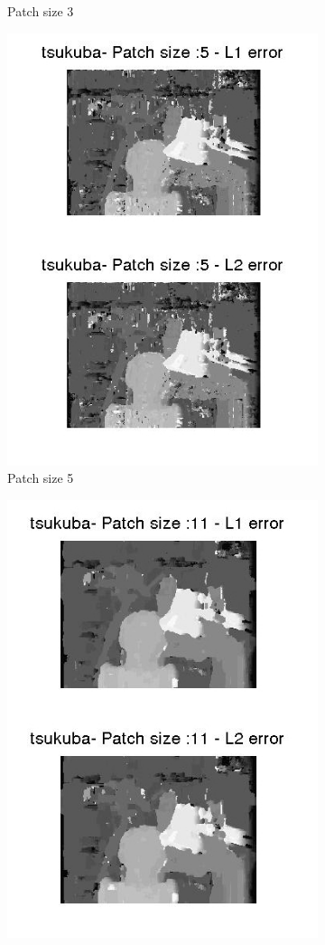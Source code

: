 \documentclass[fleqn]{article}
\begin{document}
\begin{figure}[!ht]
\begin{subfigure}{0.5\textwidth}
\caption{Patch size 3}
\end{subfigure}
 \begin{subfigure}{0.5\textwidth}
 \centering
\includegraphics[scale=0.3]{./pics/tsukuba_disparity_patchsize_5.jpg}
\caption{Patch size 5}
\end{subfigure}
 \begin{subfigure}{0.5\textwidth}
 \centering
\includegraphics[scale=0.3]{./pics/tsukuba_disparity_patchsize_11.jpg}

\end{subfigure}
\end{figure}
\end{document}
